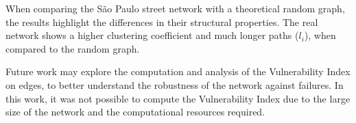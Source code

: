 \documentclass{pssbmac}
\begin{document}
When comparing the São Paulo street network with a theoretical random graph, the results highlight the differences in their structural properties. The real network shows a higher clustering coefficient and much longer paths ($l_i$), when compared to the random graph.

Future work may explore the computation and analysis of the Vulnerability Index on edges, to better understand the robustness of the network against failures. In this work, it was not possible to compute the Vulnerability Index due to the large size of the network and the computational resources required.

\printbibliography
\end{document}
